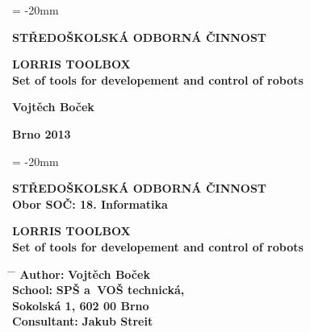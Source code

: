 \documentclass[12pt, a4paper, oneside]{article}
\newcommand{\B}{\textbf} %
\begin{document}

\pagestyle{empty} %
 
\voffset = -20mm %
\enlargethispage{60mm} %

\begin{center}
 
\Large \B{STŘEDOŠKOLSKÁ ODBORNÁ ČINNOST}

\vspace{60mm}

\huge %
\B{LORRIS TOOLBOX \\ Set of tools for developement and control of robots}

\Large

\vspace{90mm}


\B{Vojtěch Boček} \\

\vspace{40mm}

\B{Brno 2013}


\end{center}

\newpage %

\voffset = -20mm %
\enlargethispage{60mm} %

\begin{center}

\Large \B{STŘEDOŠKOLSKÁ ODBORNÁ ČINNOST}  \\
\vspace{10mm}
 \normalsize 
\B{Obor SOČ: 18. Informatika}%

\vspace{45mm}

\LARGE %
\B{LORRIS TOOLBOX \\ Set of tools for developement and control of robots} 
\end{center}  
\large

\vspace{50mm}


\begin{tabbing}
\hspace{10mm} \= \hspace{30mm}  \=   \kill %
  \> \B{Author:}  \> \B{Vojtěch Boček}        \\[8mm] 
  \> \B{School:}   \> \B{SPŠ a~VOŠ technická, }     \\
  \>              \> \B{Sokolská 1, 602 00 Brno}    \\[8mm]

  \> \B{Consultant:} \> \B {Jakub Streit} 
\end{tabbing}
\end{document}
